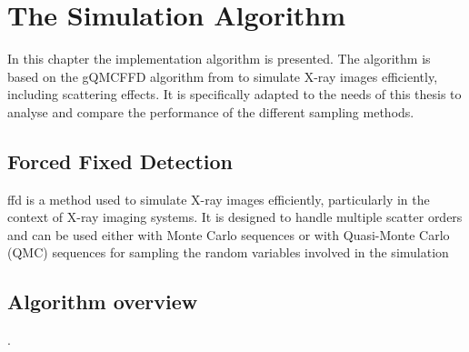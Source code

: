 \chapter{The Simulation Algorithm} %
\label{Chapter5} %


In this chapter the implementation algorithm is presented. The algorithm is
based on the gQMCFFD algorithm from \cite{qmcXray2023} to simulate X-ray images
efficiently, including scattering effects. It is specifically adapted to the
needs of this thesis to analyse and compare the performance of the different
sampling methods.

\section{Forced Fixed Detection}

\ac{ffd} is a method used to simulate X-ray images efficiently, particularly in the context of X-ray imaging systems. It is designed to handle multiple scatter orders and can be used either with Monte Carlo sequences or with Quasi-Monte Carlo (QMC) sequences for sampling the random variables involved in the simulation
\section{Algorithm overview}































\pagebreak
.


